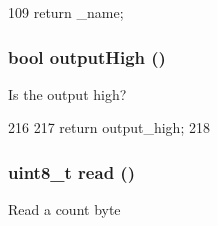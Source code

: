 \begin{DoxyCode}
109 { return _name; }
\end{DoxyCode}
\hypertarget{classIntel8254Timer_1_1Counter_a9003eb9ea7431f3438de9e52a11d579b}{
\subsubsection[{outputHigh}]{\setlength{\rightskip}{0pt plus 5cm}bool outputHigh ()}}
\label{classIntel8254Timer_1_1Counter_a9003eb9ea7431f3438de9e52a11d579b}
Is the output high? 


\begin{DoxyCode}
216 {
217     return output_high;
218 }
\end{DoxyCode}
\hypertarget{classIntel8254Timer_1_1Counter_a74dc94b86d35235e39a000a34b3085c5}{
\subsubsection[{read}]{\setlength{\rightskip}{0pt plus 5cm}uint8\_\-t read ()}}
\label{classIntel8254Timer_1_1Counter_a74dc94b86d35235e39a000a34b3085c5}
Read a count byte 


